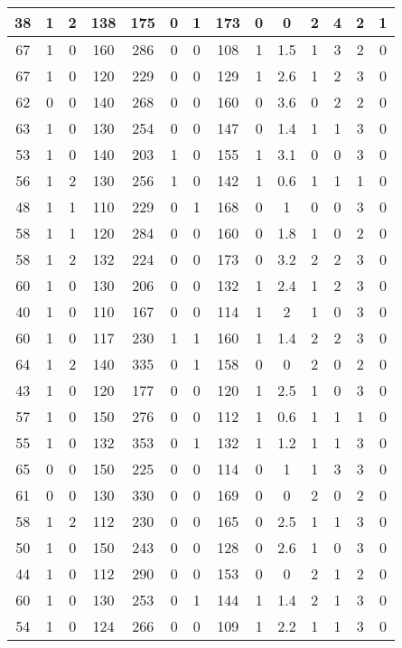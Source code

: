 \documentclass{article}
\begin{document}
\begin{longtable}{|c|c|c|c|c|c|c|c|c|c|c|c|c|c|}
38 & 1 & 2 & 138 & 175 & 0 & 1 & 173 & 0 & 0 & 2 & 4 & 2 & 1\\ \hline
67 & 1 & 0 & 160 & 286 & 0 & 0 & 108 & 1 & 1.5 & 1 & 3 & 2 & 0\\ \hline
67 & 1 & 0 & 120 & 229 & 0 & 0 & 129 & 1 & 2.6 & 1 & 2 & 3 & 0\\ \hline
62 & 0 & 0 & 140 & 268 & 0 & 0 & 160 & 0 & 3.6 & 0 & 2 & 2 & 0\\ \hline
63 & 1 & 0 & 130 & 254 & 0 & 0 & 147 & 0 & 1.4 & 1 & 1 & 3 & 0\\ \hline
53 & 1 & 0 & 140 & 203 & 1 & 0 & 155 & 1 & 3.1 & 0 & 0 & 3 & 0\\ \hline
56 & 1 & 2 & 130 & 256 & 1 & 0 & 142 & 1 & 0.6 & 1 & 1 & 1 & 0\\ \hline
48 & 1 & 1 & 110 & 229 & 0 & 1 & 168 & 0 & 1 & 0 & 0 & 3 & 0\\ \hline
58 & 1 & 1 & 120 & 284 & 0 & 0 & 160 & 0 & 1.8 & 1 & 0 & 2 & 0\\ \hline
58 & 1 & 2 & 132 & 224 & 0 & 0 & 173 & 0 & 3.2 & 2 & 2 & 3 & 0\\ \hline
60 & 1 & 0 & 130 & 206 & 0 & 0 & 132 & 1 & 2.4 & 1 & 2 & 3 & 0\\ \hline
40 & 1 & 0 & 110 & 167 & 0 & 0 & 114 & 1 & 2 & 1 & 0 & 3 & 0\\ \hline
60 & 1 & 0 & 117 & 230 & 1 & 1 & 160 & 1 & 1.4 & 2 & 2 & 3 & 0\\ \hline
64 & 1 & 2 & 140 & 335 & 0 & 1 & 158 & 0 & 0 & 2 & 0 & 2 & 0\\ \hline
43 & 1 & 0 & 120 & 177 & 0 & 0 & 120 & 1 & 2.5 & 1 & 0 & 3 & 0\\ \hline
57 & 1 & 0 & 150 & 276 & 0 & 0 & 112 & 1 & 0.6 & 1 & 1 & 1 & 0\\ \hline
55 & 1 & 0 & 132 & 353 & 0 & 1 & 132 & 1 & 1.2 & 1 & 1 & 3 & 0\\ \hline
65 & 0 & 0 & 150 & 225 & 0 & 0 & 114 & 0 & 1 & 1 & 3 & 3 & 0\\ \hline
61 & 0 & 0 & 130 & 330 & 0 & 0 & 169 & 0 & 0 & 2 & 0 & 2 & 0\\ \hline
58 & 1 & 2 & 112 & 230 & 0 & 0 & 165 & 0 & 2.5 & 1 & 1 & 3 & 0\\ \hline
50 & 1 & 0 & 150 & 243 & 0 & 0 & 128 & 0 & 2.6 & 1 & 0 & 3 & 0\\ \hline
44 & 1 & 0 & 112 & 290 & 0 & 0 & 153 & 0 & 0 & 2 & 1 & 2 & 0\\ \hline
60 & 1 & 0 & 130 & 253 & 0 & 1 & 144 & 1 & 1.4 & 2 & 1 & 3 & 0\\ \hline
54 & 1 & 0 & 124 & 266 & 0 & 0 & 109 & 1 & 2.2 & 1 & 1 & 3 & 0\\ \hline

\end{longtable}
\end{document}
